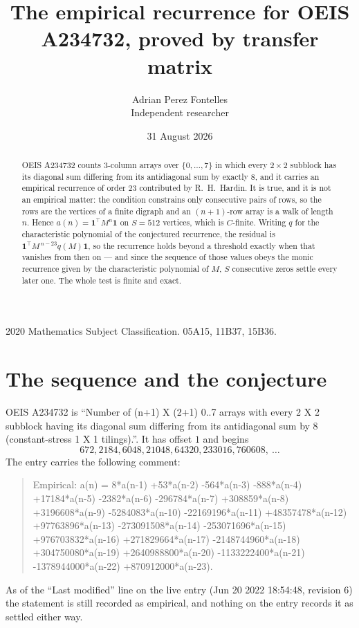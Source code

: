 \documentclass[11pt,a4paper]{article}
\title{The empirical recurrence for OEIS A234732, proved by transfer matrix}
\author{Adrian Perez Fontelles\\ \small Independent researcher}
\date{31 August 2026}
\theoremstyle{plain}
\theoremstyle{definition}
\begin{document}
\maketitle

\begin{abstract}
OEIS A234732 counts $3$-column arrays over $\{0,\dots,7\}$ in which every
$2\times2$ subblock has its diagonal sum differing from its antidiagonal sum by
exactly $8$, and it
carries an empirical recurrence of order $23$ contributed by R.~H.~Hardin. It is true,
and it is not an empirical matter: the condition constrains only consecutive pairs of rows,
so the rows are the vertices of a finite digraph and an $(n+1)$-row array is a walk of
length $n$. Hence $a(n)=\mathbf{1}^{\!\top}M^{n}\mathbf{1}$ on $S=512$ vertices, which
is $C$-finite. Writing $q$ for the characteristic polynomial of the conjectured recurrence,
the residual is $\mathbf{1}^{\!\top}M^{\,n-23}q(M)\mathbf{1}$, so the recurrence
holds beyond a threshold exactly when that vanishes from then on --- and since the sequence
of those values obeys the monic recurrence given by the characteristic polynomial of $M$,
$S$ consecutive zeros settle every later one. The whole test is finite and exact.
\end{abstract}

\noindent\small 2020 Mathematics Subject Classification. 05A15, 11B37, 15B36.\normalsize

\section{The sequence and the conjecture}

OEIS A234732 is ``Number of (n+1) X (2+1) 0..7 arrays with every 2 X 2 subblock having its diagonal sum differing from its antidiagonal sum by 8 (constant-stress 1 X 1 tilings).''. It has offset
$1$ and begins
\[
672, 2184, 6048, 21048, 64320, 233016, 760608,\ \dots
\]
The entry carries the following comment:
\begin{quote}\small
Empirical: a(n) = 8*a(n-1) +53*a(n-2) -564*a(n-3) -888*a(n-4) +17184*a(n-5) -2382*a(n-6) -296784*a(n-7) +308859*a(n-8) +3196608*a(n-9) -5284083*a(n-10) -22169196*a(n-11) +48357478*a(n-12) +97763896*a(n-13) -273091508*a(n-14) -253071696*a(n-15) +976703832*a(n-16) +271829664*a(n-17) -2148744960*a(n-18) +304750080*a(n-19) +2640988800*a(n-20) -1133222400*a(n-21) -1378944000*a(n-22) +870912000*a(n-23).
\end{quote}
As of the ``Last modified'' line on the live entry (Jun 20 2022 18:54:48, revision 6) the statement is
still recorded as empirical, and nothing on the entry records it as settled either way.
\end{document}
